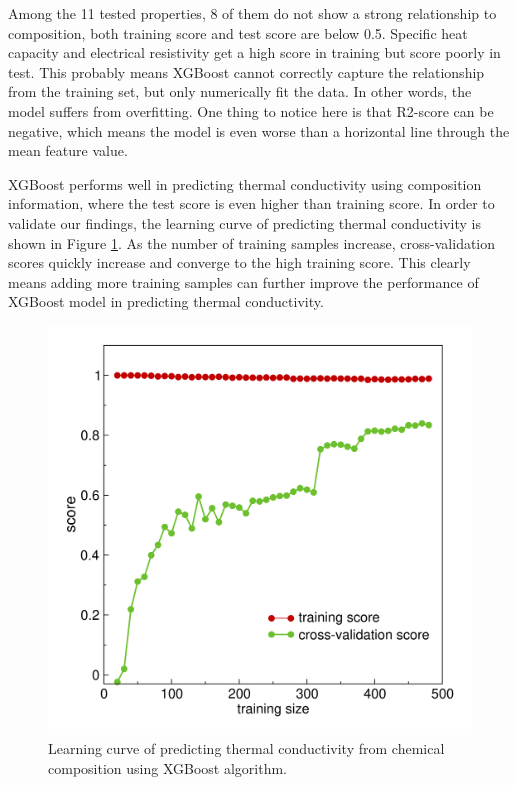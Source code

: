 \documentclass[10pt,aps,prb,amsmath,amssymb,twocolumn,letterpaper,nobalancelastpage,final,citeautoscript,floatfix,raggedbottom,superscriptaddress]{revtex4-1}
\begin{document}
Among the 11 tested properties, 8 of them do not show a strong relationship to composition, both training score and test score are below 0.5. Specific heat capacity and electrical resistivity get a high score in training but score poorly in test. This probably means XGBoost cannot correctly capture the relationship from the training set, but only numerically fit the data. In other words, the model suffers from overfitting. One thing to notice here is that R2-score can be negative, which means the model is even worse than a horizontal line through the mean feature value.

XGBoost performs well in predicting thermal conductivity using composition information, where the test score is even higher than training score. In order to validate our findings, the learning curve of predicting thermal conductivity is shown in Figure \ref{fig:learning_curve}. As the number of training samples increase, cross-validation scores quickly increase and converge to the high training score. This clearly means adding more training samples can further improve the performance of XGBoost model in predicting thermal conductivity.

\begin{figure}[h]
  \center
  \vspace{-1mm}
 \includegraphics[width=0.95\linewidth]{figures/learning_curve.png}
  \caption{Learning curve of predicting thermal conductivity from chemical composition using XGBoost algorithm.}
  \label{fig:learning_curve}
\end{figure}
\end{document}
